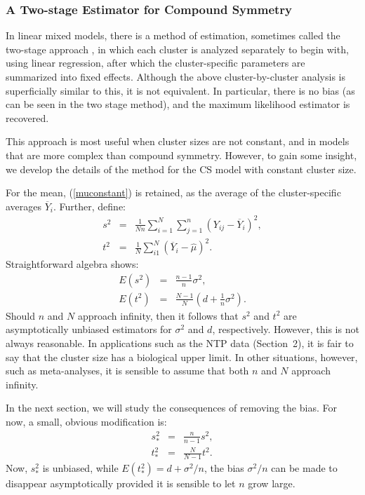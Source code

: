 \documentclass[11pt,a5paper,twoside]{book}
\begin{document}
{\subsubsection{A Two-stage Estimator for Compound Symmetry}

In linear mixed models, there is a method of estimation, sometimes called 
the two-stage approach \citep{laird1982random,verbeke2009}, in which each cluster is 
analyzed separately to begin with, using linear regression, after 
which the cluster-specific parameters are summarized into fixed effects. 
Although the above cluster-by-cluster analysis is superficially similar to this,
it is not equivalent. In particular, there is no bias (as can be seen in 
the two stage method), and the maximum likelihood estimator is recovered. 

This approach is most useful when cluster sizes are not constant, 
and in models that are more complex than compound symmetry. However, 
to gain some insight, we develop the details of the method for the CS model 
with constant cluster size.

For the mean, (\ref{muconstant}) is retained, as the average of the 
cluster-specific averages $\overline{Y}_i$. Further, define:
\begin{eqnarray}
\label{twostages1}
s^2&=&\frac{1}{Nn}\sum_{i=1}^N\sum_{j=1}^n(Y_{ij}-\overline{Y}_i)^2,\\
t^2&=&\frac{1}{N}\sum_{i1}^N(\overline{Y}_i-\widehat{\mu})^2.
\label{twostaget1}
\end{eqnarray}
Straightforward algebra shows:
\begin{eqnarray}
\label{exps1}
E(s^2)&=&\frac{n-1}{n}\sigma^2,\\
\label{expt1}
E(t^2)&=&\frac{N-1}{N}\left(d+\frac{1}{n}\sigma^2\right).
\end{eqnarray}
Should $n$ and $N$ approach infinity, then it follows that $s^2$ and $t^2$ 
are asymptotically unbiased estimators for $\sigma^2$ and $d$, 
respectively. However, this is not always reasonable. In applications 
such as the NTP data (Section~2),
it is fair to say that 
the cluster size has a biological upper limit. In other situations, 
however, such as meta-analyses, it is sensible to assume that both 
$n$ and $N$ approach infinity.

In the next section, we will study the consequences of removing the bias. 
For now, a small, obvious modification is:
\begin{eqnarray}
\label{twostages2}
s^2_\ast&=&\frac{n}{n-1}s^2,\\
t^2_\ast&=&\frac{N}{N-1}t^2.
\label{twostaget2}
\end{eqnarray}
Now, $s^2_\ast$ is unbiased, while $E(t^2_\ast)=d+\sigma^2/n$, 
the bias $\sigma^2/n$ can be made to disappear asymptotically 
provided it is sensible to let $n$ grow large.

}
\end{document}
